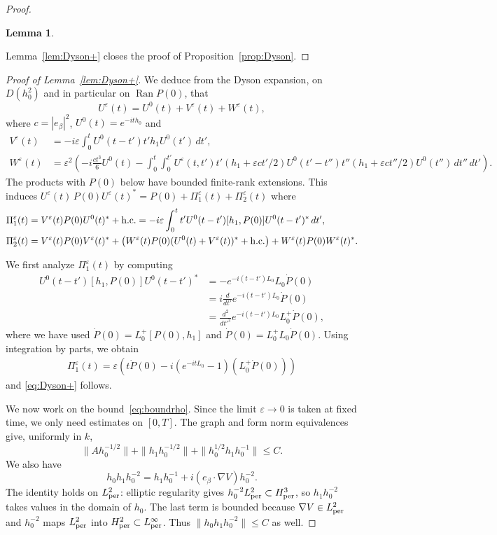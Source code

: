 \documentclass[a4paper,11pt]{article}
\theoremstyle{plain}
\newtheorem{lemma}[theorem]{Lemma}
\theoremstyle{remark}
\def\eps{{\varepsilon}}
\begin{document}
\begin{proof}[Proof]
\begin{lemma}
\end{lemma}

Lemma~\ref{lem:Dyson+} closes the proof of Proposition~\ref{prop:Dyson}.
\end{proof}


\begin{proof}[Proof of Lemma~\ref{lem:Dyson+}]
We deduce from the Dyson expansion, on $D(h_0^2)$ and in particular
on $\operatorname{Ran}P(0)$, that
$$
U^\eps(t)=U^0(t)+V^\eps(t)+W^\eps(t),
$$
where $c=|e_\beta|^2$, {$U^0(t)=e^{-ith_0}$} and
\begin{align*}
V^\eps(t) &= - i\eps \int_0^t U^0(t-t')  t' h_1 U^0(t') \, dt', \\
W^\eps(t) &=\eps^2\left(-i\frac{ct^3}{6}U^0(t)
-\int_0^t\int_0^{t'}U^\eps(t,t')t'(h_1+\eps ct'/2)
U^0(t'-t'')t''(h_1+\eps ct''/2)U^0(t'')\,dt''\,dt'\right).
\end{align*}
The products with $P(0)$ below have bounded finite-rank extensions.
This induces $U^\eps(t)\, P(0) U^\eps(t)^* = P(0) + \Pi^\eps_1(t)+\Pi^\eps_2(t)$
where
\begin{align*}
\Pi^\eps_1(t)&=V^\eps(t)P(0)U^0(t)^* + {\rm h.c.} = - i\eps \int_0^t t' U^0(t-t')  [h_1,P(0)] U^0(t-t')^* \, dt', \\
\Pi^\eps_2(t)&=V^\eps(t)P(0)V^\eps(t)^* + \left( W^\eps(t) P(0) (U^0(t)+V^\eps(t))^* + {\rm h.c.} \right) + W^\eps(t)P(0)W^\eps(t)^*.
\end{align*}

\medskip

We first analyze $\Pi^\eps_1(t)$ by computing
\begin{align*}
  U^0(t-t') [h_1,P(0)] U^0(t-t')^* &= - e^{-i(t-t') L_{0}} L_{0} \dot P(0)\\
  &= i\frac{d}{dt'} e^{-i(t-t') L_{0}} \dot P(0)\\
  &= \frac{d^{2}}{dt'^{2}} e^{-i(t-t') L_{0}} L_{0}^{+}\dot P(0),
\end{align*}
where we have used $\dot P(0) = L_{0}^{+}[P(0),h_{1}]$ and
$\dot P(0) = L_{0}^{+} L_{0} \dot P(0)$. Using integration by parts, we obtain
\begin{align*}
  \Pi^{\eps}_{1}(t) = \eps \left(t \dot{P}(0) - i \left( e^{-itL_0}-1 \right) (L_0^+\dot{P}(0))\right)
\end{align*}
and \eqref{eq:Dyson+} follows.


We now work on the bound~\eqref{eq:boundrho}. Since the limit
$\eps\to0$ is taken at fixed time, we only need estimates on $[0,T]$.
The graph and form norm equivalences give, uniformly in $k$,
\[
\|Ah_0^{-1/2}\|+\|h_1h_0^{-1/2}\|
+\|h_0^{1/2}h_1h_0^{-1}\|\le C.
\]
We also have
\[
h_0h_1h_0^{-2}=h_1h_0^{-1}
+i(e_\beta\cdot\nabla V)h_0^{-2}.
\]
The identity holds on $L^2_{\rm per}$: elliptic regularity gives
$h_0^{-2}L^2_{\rm per}\subset H^3_{\rm per}$, so $h_1h_0^{-2}$ takes
values in the domain of $h_0$. The last term is bounded because $\nabla V\in L^2_{\rm per}$ and
$h_0^{-2}$ maps $L^2_{\rm per}$ into $H^2_{\rm per}\subset L^\infty_{\rm per}$.
Thus $\|h_0h_1h_0^{-2}\|\le C$ as well.


\end{proof}
\end{document}
